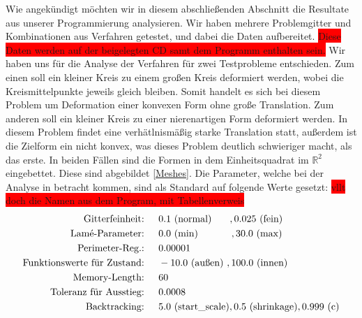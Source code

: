 Wie angekündigt möchten wir in diesem abschließenden Abschnitt die Resultate aus unserer Programmierung analysieren. Wir haben mehrere Problemgitter und Kombinationen aus Verfahren getestet, und dabei die Daten aufbereitet. \colorbox{red}{Diese Daten werden auf der beigelegten CD samt dem Programm enthalten sein.}
Wir haben uns für die Analyse der Verfahren für zwei Testprobleme entschieden. Zum einen soll ein kleiner Kreis zu einem großen Kreis deformiert werden, wobei die Kreismittelpunkte jeweils gleich bleiben. Somit handelt es sich bei diesem Problem um Deformation einer konvexen Form ohne große Translation. Zum anderen soll ein kleiner Kreis zu einer nierenartigen Form deformiert werden. In diesem Problem findet eine verhätlnismäßig starke Translation statt, außerdem ist die Zielform ein nicht konvex, was dieses Problem deutlich schwieriger macht, als das erste. In beiden Fällen sind die Formen in dem Einheitsquadrat im $\mathbb{R}^2$ eingebettet. Diese sind abgebildet \ref{Meshes}. 
Die Parameter, welche bei der Analyse in betracht kommen, sind als Standard auf folgende Werte gesetzt:
\colorbox{red}{vllt doch die Namen aus dem Program, mit Tabellenverweis}
\begin{align*}
\text{Gitterfeinheit: \hspace{0.2cm} }& 0.1 \text{ (normal)} \hspace{0.65cm} ,0.025 \text{ (fein)} \\
\text{Lamé-Parameter: \hspace{0.2cm} }& 0.0 \text{ (min)} \hspace{1.2cm}  ,30.0 \text{ (max)} \\
\text{Perimeter-Reg.: \hspace{0.2cm} }& 0.00001 \\
\text{Funktionswerte für Zustand: \hspace{0.2cm} }& -10.0 \text{ (außen) },  100.0 \text{ (innen)} \\
\text{Memory-Length: \hspace{0.2cm} }& 60 \\
\text{Toleranz für Ausstieg: \hspace{0.2cm} }& 0.0008 \\
\text{Backtracking: \hspace{0.2cm} }& 5.0 \text{ (start\_scale)}, 0.5 \text{ (shrinkage)}, 0.999 \text{ (c)}
\end{align*}


